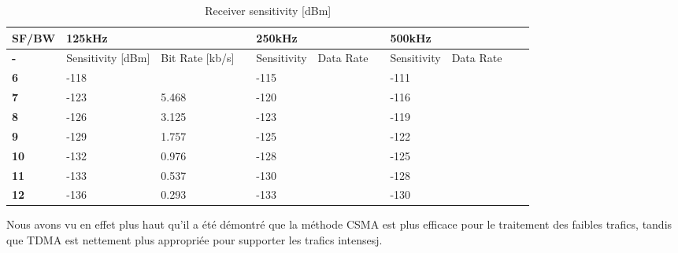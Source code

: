 \begin{table}[h!]
\scriptsize
	\begin{tabular}{l|lll|lll|lll|l}
	\textbf{SF/BW} & \multicolumn{3}{l}{\textbf{125kHz}}                   & \multicolumn{3}{l}{\textbf{250kHz} }             & \multicolumn{3}{l}{\textbf{500kHz} }             & \\\hline
	\textbf{-}     & Sensitivity [dBm]                  & Bit Rate [kb/s]&   & Sensitivity                        & Data Rate &   & Sensitivity                        & Data Rate &   & \\
	\textbf{6}     & -118                               &                &   & -115                               &           &   & -111                               &           &   & \\
	\textbf{7}     & -123                               & 5.468          &   & -120                               &           &   & -116                               &           &   & \\
	\textbf{8}     & -126                               & 3.125          &   & -123                               &           &   & -119                               &           &   & \\
	\textbf{9}     & -129                               & 1.757          &   & -125                               &           &   & -122                               &           &   & \\
	\textbf{10}    & -132                               & 0.976          &   & -128                               &           &   & -125                               &           &   & \\
	\textbf{11}    & -133                               & 0.537          &   & -130                               &           &   & -128                               &           &   & \\
	\textbf{12}    & -136                               & 0.293          &   & -133                               &           &   & -130                               &           &   & \\\hline
	\end{tabular}
\caption{\label{tab:EE} Receiver sensitivity [dBm]}
\end{table}




\cite{_evaluation_} Nous avons vu en effet plus haut qu’il a été démontré que la méthode CSMA est plus efficace pour le traitement des faibles trafics,
	tandis que TDMA est nettement plus appropriée pour supporter les trafics intensesj.




